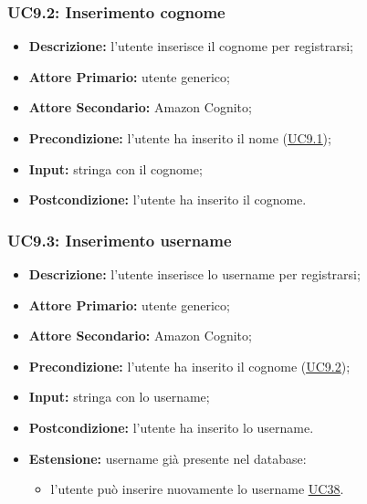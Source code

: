 \subsubsection{UC9.2: Inserimento cognome}
\label{sec:UC9.2}
\begin{itemize}
    \item \textbf{Descrizione:} l'utente inserisce il cognome per registrarsi;
    \item \textbf{Attore Primario:} utente generico;
    \item \textbf{Attore Secondario:} Amazon Cognito;
    \item \textbf{Precondizione:} l'utente ha inserito il nome (\hyperref[sec:UC9.1]{\underline{UC9.1}});
    \item \textbf{Input:} stringa con il cognome;
    \item \textbf{Postcondizione:} l'utente ha inserito il cognome.
\end{itemize}

\subsubsection{UC9.3: Inserimento username}
\label{sec:UC9.3}
\begin{itemize}
    \item \textbf{Descrizione:} l'utente inserisce lo username per registrarsi;
    \item \textbf{Attore Primario:} utente generico;
    \item \textbf{Attore Secondario:} Amazon Cognito;
    \item \textbf{Precondizione:} l'utente ha inserito il cognome (\hyperref[sec:UC9.2]{\underline{UC9.2}});
    \item \textbf{Input:} stringa con lo username;
    \item \textbf{Postcondizione:} l'utente ha inserito lo username.
    \item \textbf{Estensione:} username già presente nel database:
          \begin{itemize}
              \item l'utente può inserire nuovamente lo username \underline{\hyperref[sec:UC38]{UC38}}.
          \end{itemize}
\end{itemize}

